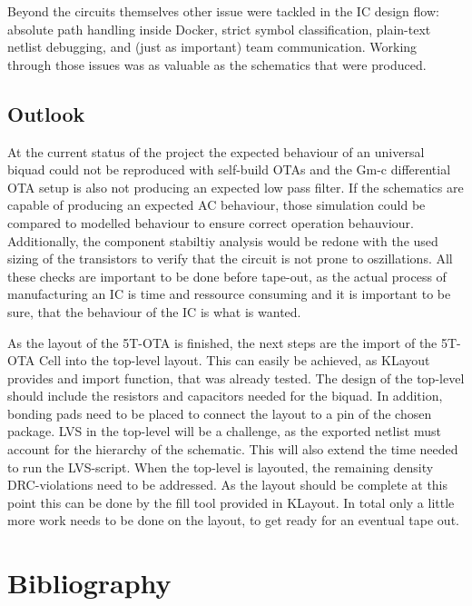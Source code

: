 \documentclass[
  letterpaper,
]{scrbook}
\begin{document}
Beyond the circuits themselves other issue were tackled in the IC design
flow: absolute path handling inside Docker, strict symbol
classification, plain-text netlist debugging, and (just as important)
team communication. Working through those issues was as valuable as the
schematics that were produced.

\section{Outlook}\label{outlook}

At the current status of the project the expected behaviour of an
universal biquad could not be reproduced with self-build OTAs and the
Gm-c differential OTA setup is also not producing an expected low pass
filter. If the schematics are capable of producing an expected AC
behaviour, those simulation could be compared to modelled behaviour to
ensure correct operation behauviour. Additionally, the component
stabiltiy analysis would be redone with the used sizing of the
transistors to verify that the circuit is not prone to oszillations. All
these checks are important to be done before tape-out, as the actual
process of manufacturing an IC is time and ressource consuming and it is
important to be sure, that the behaviour of the IC is what is wanted.

As the layout of the 5T-OTA is finished, the next steps are the import
of the 5T-OTA Cell into the top-level layout. This can easily be
achieved, as KLayout provides and import function, that was already
tested. The design of the top-level should include the resistors and
capacitors needed for the biquad. In addition, bonding pads need to be
placed to connect the layout to a pin of the chosen package. LVS in the
top-level will be a challenge, as the exported netlist must account for
the hierarchy of the schematic. This will also extend the time needed to
run the LVS-script. When the top-level is layouted, the remaining
density DRC-violations need to be addressed. As the layout should be
complete at this point this can be done by the fill tool provided in
KLayout. In total only a little more work needs to be done on the
layout, to get ready for an eventual tape out.


\chapter*{Bibliography}\label{bibliography}
\end{document}
